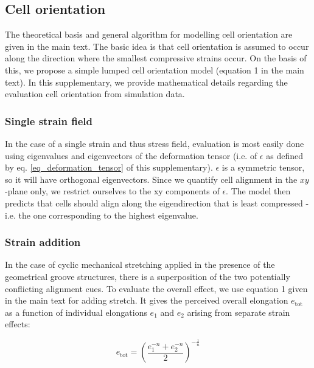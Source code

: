 \documentclass[11pt]{amsart}
\begin{document}
\subsection{Cell orientation}

The theoretical basis and general algorithm for modelling cell orientation are given in the main text. The basic idea is that cell orientation is assumed to occur along the direction where the smallest compressive strains occur\cite{vigliotti_thermodynamically_2016,chen_role_2018}. On the basis of this, we propose a simple lumped cell orientation model (equation 1 in the main text). In this supplementary, we provide mathematical details regarding the evaluation cell orientation from simulation data.

\subsubsection{Single strain field}

In the case of a single strain and thus stress field, evaluation is most easily done using eigenvalues and eigenvectors of the deformation tensor (i.e. of $\epsilon$ as defined by eq. \ref{eq_deformation_tensor} of this supplementary). $\epsilon$ is a symmetric tensor, so it will have orthogonal eigenvectors. Since we quantify cell alignment in the $xy$-plane only, we restrict ourselves to the xy components of $\epsilon$. The model then predicts that cells should align along the eigendirection that is least compressed\cite{vigliotti_thermodynamically_2016,chen_role_2018} - i.e. the one corresponding to the highest eigenvalue.

\subsubsection{Strain addition}

In the case of cyclic mechanical stretching applied in the presence of the geometrical groove structures, there is a superposition of the two potentially conflicting alignment cues. To evaluate the overall effect, we use equation 1 given in the main text for adding stretch. It gives the perceived overall elongation $e_\text{tot}$ as a function of individual elongations $e_1$ and $e_2$ arising from separate strain effects:

\begin{equation}
e_\text{tot}=\left( \frac{ e_1^{-n}+e_2^{-n}}{2} \right)^{-\frac{1}{n}} \label{eq_strain_addition}
\end{equation}
\end{document}
